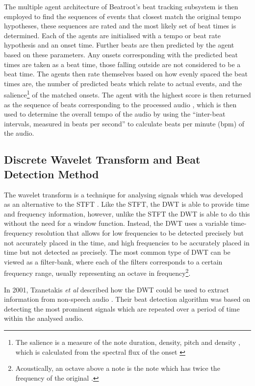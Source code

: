\documentclass[a4paper, 11pt]{article}
\begin{document}
The multiple agent architecture of Beatroot's beat tracking subsystem is then employed to find the sequences of events that closest match the original tempo hypotheses, these sequences are rated and the most likely set of beat times is determined. Each of the agents are initialised with a tempo or beat rate hypothesis and an onset time. Further beats are then predicted by the agent based on these parameters. Any onsets corresponding with the predicted beat times are taken as a beat time, those falling outside are not considered to be a beat time. The agents then rate themselves based on how evenly spaced the beat times are, the number of predicted beats which relate to actual events, and the salience\footnote{The salience is a measure of the note duration, density, pitch and density \cite{dixon1}, which is calculated from the spectral flux of the onset \cite{dixon4}} of the matched onsets. The agent with the highest score is then returned as the sequence of beats corresponding to the processed audio \cite{dixon4}, which is then used to determine the overall tempo of the audio by using the ``inter-beat intervals, measured in beats per second'' \cite{dixon1} to calculate beats per minute (bpm) of the audio.


\subsection{Discrete Wavelet Transform and Beat Detection Method}
The wavelet transform is a technique for analysing signals which was developed as an alternative to the STFT \cite{tzane1}. Like the STFT, the DWT is able to provide time and frequency information, however, unlike the STFT the DWT is able to do this without the need for a window function. Instead, the DWT uses a variable time-frequency resolution that allows for low frequencies to be detected precisely but not accurately placed in the time, and high frequencies to be accurately placed in time but not detected as precisely. The most common type of DWT can be viewed as a filter-bank, where each of the filters corresponds to a certain frequency range, usually representing an octave in frequency\footnote{Acoustically, an octave above a note is the note which has twice the frequency of the original \cite{oxford-comp}.}\cite{tzane2}.

In 2001, Tzanetakis \textit{et al} described how the DWT could be used to extract information from non-speech audio \cite{tzane1}. Their beat detection algorithm was based on detecting the most prominent signals which are repeated over a period of time within the analysed audio. \par
\end{document}
